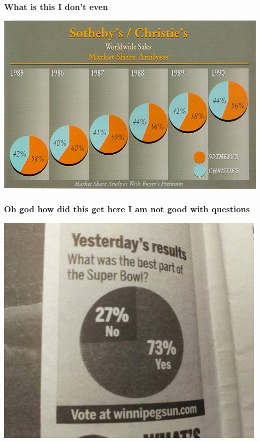 \documentclass{beamer}
\begin{document}
\begin{frame}
  \frametitle{What is this I don't even}
  \includegraphics[width = \textwidth, keepaspectratio = true]{figure/sothebys}
\end{frame}

\begin{frame}
  \frametitle{Oh god how did this get here I am not good with questions}
  \begin{center}
    \includegraphics[height = 0.8\textheight, keepaspectratio = true]{figure/super_bowl}
  \end{center}
\end{frame}
\end{document}
